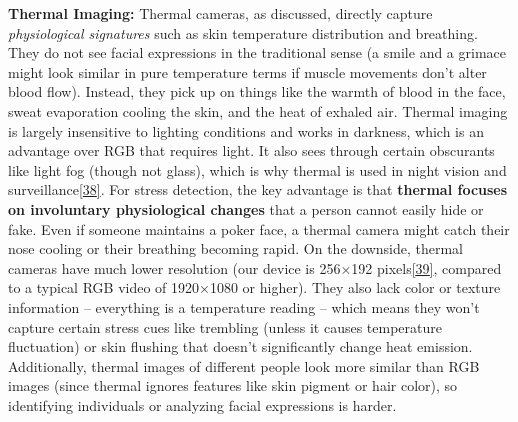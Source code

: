 \documentclass[12pt,a4paper]{article}
\begin{document}
\textbf{Thermal Imaging:} Thermal cameras, as discussed, directly capture \emph{physiological signatures} such as skin temperature distribution and breathing. They do not see facial expressions in the traditional sense (a smile and a grimace might look similar in pure temperature terms if muscle movements don't alter blood flow). Instead, they pick up on things like the warmth of blood in the face, sweat evaporation cooling the skin, and the heat of exhaled air. Thermal imaging is largely insensitive to lighting conditions and works in darkness, which is an advantage over RGB that requires light. It also sees through certain obscurants like light fog (though not glass), which is why thermal is used in night vision and surveillance\href{https://www.lynred-usa.com/homepage/about-us/blog/visible-vs-thermal-detection-advantages-and-disadvantages.html?VISIBLE\%20vs.\%20THERMAL\%20DETECTION:\%20Advantages\%20and\%20Disadvantages\#:~:text=VISIBLE\%20vs,other\%20words\%2C\%20performance\%20is}{{[}38{]}}. For stress detection, the key advantage is that \textbf{thermal focuses on involuntary physiological changes} that a person cannot easily hide or fake. Even if someone maintains a poker face, a thermal camera might catch their nose cooling or their breathing becoming rapid. On the downside, thermal cameras have much lower resolution (our device is 256×192 pixels\href{https://github.com/buccancs/bucika_gsr/blob/7048f7f6a7536f5cd577ed2184800d3dad97fd08/AndroidApp/src/main/java/com/multisensor/recording/recording/ThermalRecorder.kt\#L53-L61}{{[}39{]}}, compared to a typical RGB video of 1920×1080 or higher). They also lack color or texture information -- everything is a temperature reading -- which means they won't capture certain stress cues like trembling (unless it causes temperature fluctuation) or skin flushing that doesn't significantly change heat emission. Additionally, thermal images of different people look more similar than RGB images (since thermal ignores features like skin pigment or hair color), so identifying individuals or analyzing facial expressions is harder.
\end{document}
